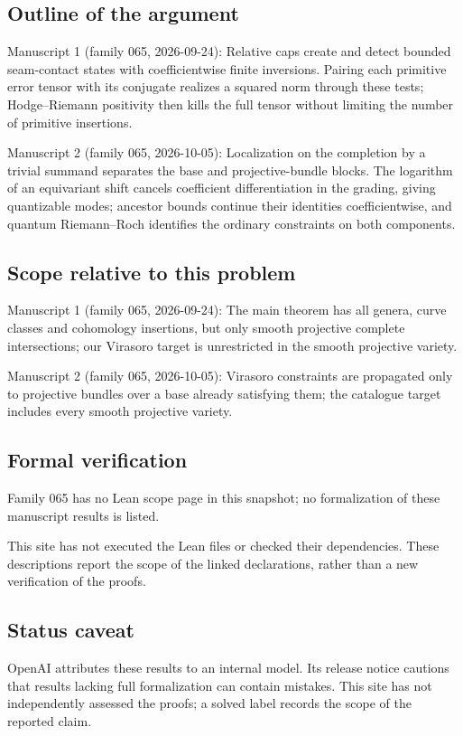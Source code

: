 \documentclass[11pt]{article}
\begin{document}
\subsection{Outline of the argument}
Manuscript 1 (family 065, 2026-09-24): Relative caps create and detect bounded seam-contact states with coefficientwise finite inversions. Pairing each primitive error tensor with its conjugate realizes a squared norm through these tests; Hodge--Riemann positivity then kills the full tensor without limiting the number of primitive insertions.

Manuscript 2 (family 065, 2026-10-05): Localization on the completion by a trivial summand separates the base and projective-bundle blocks. The logarithm of an equivariant shift cancels coefficient differentiation in the grading, giving quantizable modes; ancestor bounds continue their identities coefficientwise, and quantum Riemann--Roch identifies the ordinary constraints on both components.

\subsection{Scope relative to this problem}
Manuscript 1 (family 065, 2026-09-24): The main theorem has all genera, curve classes and cohomology insertions, but only smooth projective complete intersections; our Virasoro target is unrestricted in the smooth projective variety.

Manuscript 2 (family 065, 2026-10-05): Virasoro constraints are propagated only to projective bundles over a base already satisfying them; the catalogue target includes every smooth projective variety.

\subsection{Formal verification}
Family 065 has no Lean scope page in this snapshot; no formalization of these manuscript results is listed.

This site has not executed the Lean files or checked their dependencies. These descriptions report the scope of the linked declarations, rather than a new verification of the proofs.

\subsection{Status caveat}
OpenAI attributes these results to an internal model. Its release notice cautions that results lacking full formalization can contain mistakes. This site has not independently assessed the proofs; a solved label records the scope of the reported claim.
\end{document}
